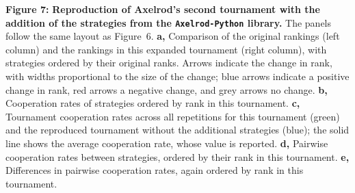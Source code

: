 \documentclass{article}
\newcommand{\AXL}{\texttt{Axelrod-Python}}
\begin{document}
\noindent
\textbf{Figure 7:} \textbf{Reproduction of Axelrod's second tournament with the addition
of the strategies from the \AXL{} library.}
The panels follow the same layout as
Figure~6.
\textbf{a,} Comparison of the original rankings (left column) and the rankings
in this expanded tournament (right column), with strategies ordered by their
original ranks. Arrows indicate the change in rank, with widths proportional to
the size of the change; blue arrows indicate a positive change in rank, red
arrows a negative change, and grey arrows no change.
\textbf{b,} Cooperation rates of strategies ordered by rank in this tournament.
\textbf{c,} Tournament cooperation rates across all repetitions for this
tournament (green) and the reproduced tournament without the additional
strategies (blue); the solid line shows the average cooperation rate, whose
value is reported.
\textbf{d,} Pairwise cooperation rates between strategies, ordered by their
rank in this tournament.
\textbf{e,} Differences in pairwise cooperation rates, again ordered by rank
in this tournament.
\end{document}
